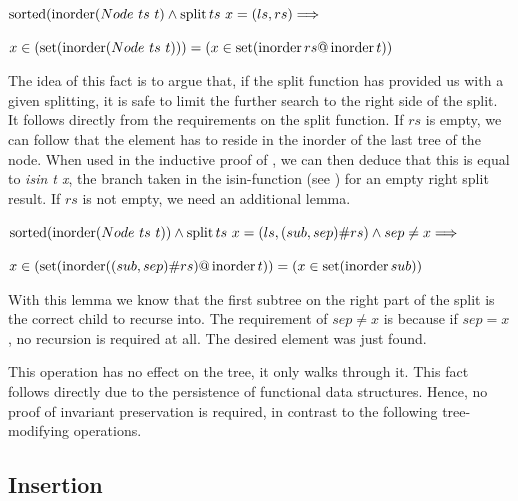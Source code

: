\begin{lemma} $\operatorname{sorted} (\operatorname{inorder} (Node\ ts\ t) \wedge \operatorname{split} ts\ x = (ls, rs) \Longrightarrow$ \\
    \begin{center}
    $x \in (\operatorname{set} (\operatorname{inorder} (Node\ ts\ t))) = (x \in \operatorname{set} (\operatorname{inorder} rs @ \operatorname{inorder} t))$
    \end{center}
\end{lemma}

The idea of this fact is to argue that, if the split function has provided
us with a given splitting, it is safe to limit the further search
to the right side of the split.
It follows directly from the requirements on the split function.
If $rs$ is empty, we can follow that the element has to reside in the inorder
of the last tree of the node.
When used in the inductive proof of , we can then deduce that this is
equal to \textit{isin t x}, the branch taken in the isin-function
(see ) for an empty right split result.
If $rs$ is not empty, we need an additional lemma.

\begin{lemma}
    $\operatorname{sorted} (\operatorname{inorder} (Node\ ts\ t)) \wedge \operatorname{split} ts\ x = (ls, (sub,sep)\#rs) \wedge sep \neq x \Longrightarrow$ \\
    \begin{center}
    $x \in (\operatorname{set} (\operatorname{inorder} ((sub,sep)\#rs) @ \operatorname{inorder} t)) = (x \in \operatorname{set} (\operatorname{inorder} sub))$
    \end{center}
\end{lemma}

With this lemma we know that the first subtree on the right part of the split
is the correct child to recurse into.
The requirement of $sep \neq x$ is because if $sep = x$,
no recursion is required at all.
The desired element was just found.

This operation has no effect on the tree, it only walks through it.
This fact follows directly due to the persistence of functional data structures.
Hence, no proof of invariant preservation is required,
in contrast to the following tree-modifying operations.

\subsection{Insertion}
\label{sec:abs-ins}



